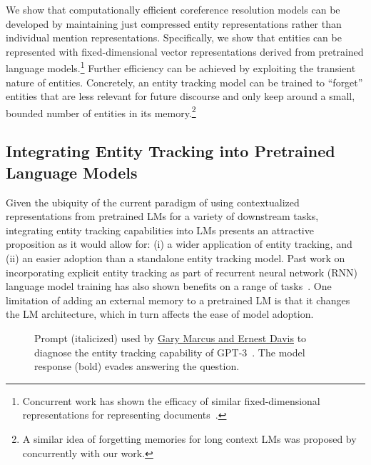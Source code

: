 \documentclass[12pt]{thesis-umich}[thesis]
\begin{document}
We show that computationally efficient coreference resolution models can be developed by maintaining just  compressed entity representations rather than individual mention representations. 
Specifically, we show that entities can be represented with fixed-dimensional vector representations derived from pretrained language models.\footnote{Concurrent work  has shown the efficacy of similar fixed-dimensional representations for representing documents~\cite{karpukhin-etal-2020-dense}.}  
Further efficiency can be achieved by exploiting the transient nature of entities. Concretely, an entity tracking model can be trained to ``forget'' entities that are less relevant for future discourse and only keep around a small, bounded number of entities in its memory.\footnote{A similar idea of forgetting memories for long context LMs was proposed by \citet{Sukhbaatar2021NotAM} concurrently with our work.} 



\subsection{Integrating Entity Tracking into Pretrained Language Models}


Given the ubiquity of the current paradigm of using contextualized representations from pretrained LMs for a variety of downstream tasks, integrating entity tracking capabilities into LMs presents an attractive proposition as it would allow for: (i) a wider application of entity tracking, and (ii) an easier adoption than a standalone entity tracking model.
Past work on incorporating explicit entity tracking as part of recurrent neural network (RNN) language model training has also shown benefits on a range of tasks~\citep{ji-etal-2017-dynamic, clark-etal-2018-neural}. 
One limitation of adding an external memory to a pretrained LM is that it changes the LM architecture, which in turn affects the ease of model adoption. 

\begin{figure}[t]
	
	\caption{Prompt (italicized) used by \href{https://www.technologyreview.com/2020/08/22/1007539/gpt3-openai-language-generator-artificial-intelligence-ai-opinion/}{Gary Marcus and Ernest Davis} to diagnose the entity tracking capability of GPT-3~\cite{brown2020language}. The model response (bold) evades answering the question.  
	}
	\label{fig:prompt_example}
\end{figure}
\end{document}

